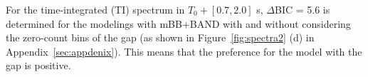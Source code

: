\documentclass[linenumbers,twocolumn]{aastex631}
\begin{document}
  For the time-integrated (TI) spectrum in $T_0+[0.7,2.0]$ s, $\Delta$BIC = 5.6 is determined for the modelings with mBB+BAND with and without considering the zero-count bins of the gap (as shown in Figure~\ref{fig:spectra2} (d) in Appendix~\ref{sec:appdenix}). This means that the preference for the model with the gap is positive.%
 
\end{document}
